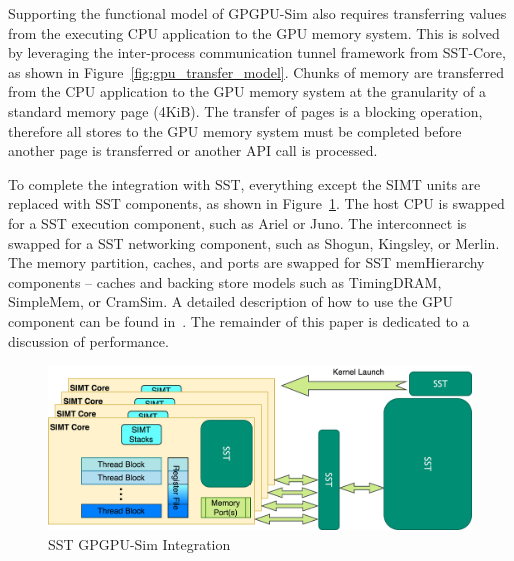 Supporting the functional model of GPGPU-Sim also requires transferring values
from the executing CPU application to the GPU memory system. This is solved by leveraging
the inter-process communication tunnel framework from SST-Core, as shown in
Figure~\ref{fig:gpu_transfer_model}. Chunks of memory are transferred from the CPU
application to the GPU memory system at the granularity of a standard memory page (4KiB). The
transfer of pages is a blocking operation, therefore all stores to the GPU
memory system must be completed before another page is transferred or another
API call is processed.

To complete the integration with SST, everything except the SIMT units are
replaced with SST components, as shown in Figure~\ref{fig:gpgpu_sst}. The host
CPU is swapped for a SST execution component, such as Ariel or Juno. The
interconnect is swapped for a SST networking component, such as Shogun,
Kingsley, or Merlin. The memory partition, caches, and ports are swapped for
SST memHierarchy components -- caches and backing store models such as
TimingDRAM, SimpleMem, or CramSim. A detailed description of how to use the GPU
component can be found in~\cite{sst_gpgpu}. The remainder of this paper is
dedicated to a discussion of performance.


   \begin{figure}[!htb]
      \centering
      \setlength{\abovecaptionskip}{6pt plus 1pt minus 1pt}
      \includegraphics[width=.85\textwidth,keepaspectratio]{figures/sst_gpgpusim_top.png}
      \captionsetup{format=hang, justification=centering, width=.75\textwidth}
      \caption{SST GPGPU-Sim Integration}
      \label{fig:gpgpu_sst}
   \end{figure}

